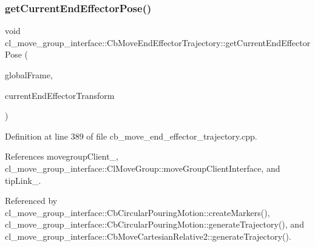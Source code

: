 \subsubsection{\texorpdfstring{get\+Current\+End\+Effector\+Pose()}{getCurrentEndEffectorPose()}}
{\footnotesize\ttfamily void cl\+\_\+move\+\_\+group\+\_\+interface\+::\+Cb\+Move\+End\+Effector\+Trajectory\+::get\+Current\+End\+Effector\+Pose (\begin{DoxyParamCaption}\item[{std\+::string}]{global\+Frame,  }\item[{tf\+::\+Stamped\+Transform \&}]{current\+End\+Effector\+Transform }\end{DoxyParamCaption})\hspace{0.3cm}{\ttfamily [protected]}}



Definition at line 389 of file cb\+\_\+move\+\_\+end\+\_\+effector\+\_\+trajectory.\+cpp.



References movegroup\+Client\+\_\+, cl\+\_\+move\+\_\+group\+\_\+interface\+::\+Cl\+Move\+Group\+::move\+Group\+Client\+Interface, and tip\+Link\+\_\+.



Referenced by cl\+\_\+move\+\_\+group\+\_\+interface\+::\+Cb\+Circular\+Pouring\+Motion\+::create\+Markers(), cl\+\_\+move\+\_\+group\+\_\+interface\+::\+Cb\+Circular\+Pouring\+Motion\+::generate\+Trajectory(), and cl\+\_\+move\+\_\+group\+\_\+interface\+::\+Cb\+Move\+Cartesian\+Relative2\+::generate\+Trajectory().


